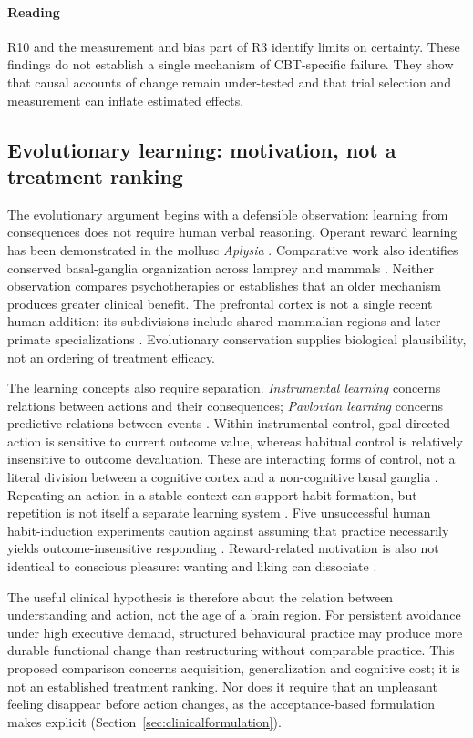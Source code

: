 \paragraph{Reading} R10 and the measurement and bias part of R3 identify limits on certainty.
These findings do not establish a single mechanism of CBT-specific failure.
They show that causal accounts of change remain under-tested and that trial selection and measurement can inflate estimated effects.

\subsection{Evolutionary learning: motivation, not a treatment ranking}\label{sec:learning}
The evolutionary argument begins with a defensible observation: learning from consequences does not require human verbal reasoning.
Operant reward learning has been demonstrated in the mollusc \emph{Aplysia} \citep{brembs2002operant}.
Comparative work also identifies conserved basal-ganglia organization across lamprey and mammals \citep{grillner2016basal}.
Neither observation compares psychotherapies or establishes that an older mechanism produces greater clinical benefit.
The prefrontal cortex is not a single recent human addition: its subdivisions include shared mammalian regions and later primate specializations \citep{preuss2022evolution}.
Evolutionary conservation supplies biological plausibility, not an ordering of treatment efficacy.

The learning concepts also require separation.
\emph{Instrumental learning} concerns relations between actions and their consequences; \emph{Pavlovian learning} concerns predictive relations between events \citep{dolan2013goals}.
Within instrumental control, goal-directed action is sensitive to current outcome value, whereas habitual control is relatively insensitive to outcome devaluation.
These are interacting forms of control, not a literal division between a cognitive cortex and a non-cognitive basal ganglia \citep{dolan2013goals}.
Repeating an action in a stable context can support habit formation, but repetition is not itself a separate learning system \citep{wood2016habit}.
Five unsuccessful human habit-induction experiments caution against assuming that practice necessarily yields outcome-insensitive responding \citep{dewit2018failures}.
Reward-related motivation is also not identical to conscious pleasure: wanting and liking can dissociate \citep{berridge2016liking}.

The useful clinical hypothesis is therefore about the relation between understanding and action, not the age of a brain region.
For persistent avoidance under high executive demand, structured behavioural practice may produce more durable functional change than restructuring without comparable practice.
This proposed comparison concerns acquisition, generalization and cognitive cost; it is not an established treatment ranking.
Nor does it require that an unpleasant feeling disappear before action changes, as the acceptance-based formulation makes explicit (Section~\ref{sec:clinicalformulation}).


